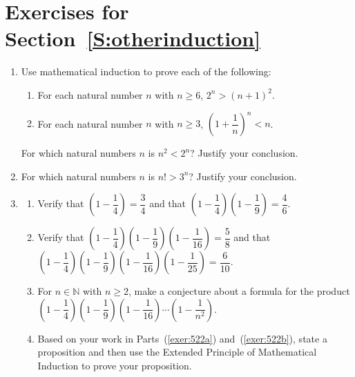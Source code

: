 \section*{Exercises for Section~\ref{S:otherinduction}}
%
\begin{enumerate}

\item Use mathematical  induction to prove each of the following: \label{exer:sec52-1}

\begin{enumerate}
  \yitem For each natural  number  $n$  with  $n \geq 2$,  $3^n  > 1 + 2^n $.

  \item For each natural  number  $n$  with  $n \geq 6$,  $2^n  > \left( n + 1 \right)^2$.

  \item For each natural  number  $n$  with  $n \geq 3$,  $\left( {1 + \dfrac{1}{n}} \right)^n  < n$.
\end{enumerate}


\xitem For  which natural numbers  $n$  is  $n^2  < 2^n$?  Justify your conclusion.
\label{exer:sec52-6}%

\item For which natural numbers $n$ is $n! > 3^n$?  Justify your conclusion.



\item \label{exer:sec52-2} \begin{enumerate} \item Verify that  $\left( {1 - \dfrac{1}{4}} \right) = \dfrac{3}
{4}$ and that  $\left( {1 - \dfrac{1}{4}} \right)\left( {1 - \dfrac{1}{9}} \right) = \dfrac{4}
{6}$. \label{exer:522a}

\item Verify that  $\left( {1 - \dfrac{1}{4}} \right)\left( {1 - \dfrac{1}{9}} \right)\left( {1 - \dfrac{1}{{16}}} \right) = \dfrac{5}{8}$ and that  
\\$\left( {1 - \dfrac{1}{4}} \right)\left( {1 - \dfrac{1}{9}} \right)\left( {1 - \dfrac{1}{{16}}} \right)\left( {1 - \dfrac{1}{{25}}} \right) = \dfrac{6}{{10}}$. \label{exer:522b}

\item For  $n \in \mathbb{N}$ with  $n \geq 2$, make a conjecture about a formula for the product  $\left( {1 - \dfrac{1}{4}} \right)\left( {1 - \dfrac{1}{9}} \right)\left( {1 - \dfrac{1}{{16}}} \right) \cdots \left( {1 - \dfrac{1}{{n^2 }}} \right)$.

\item Based on your work in Parts~(\ref{exer:522a}) and~(\ref{exer:522b}), state a proposition and then use the Extended Principle of Mathematical Induction to prove your proposition.


\end{enumerate}
\end{enumerate}
